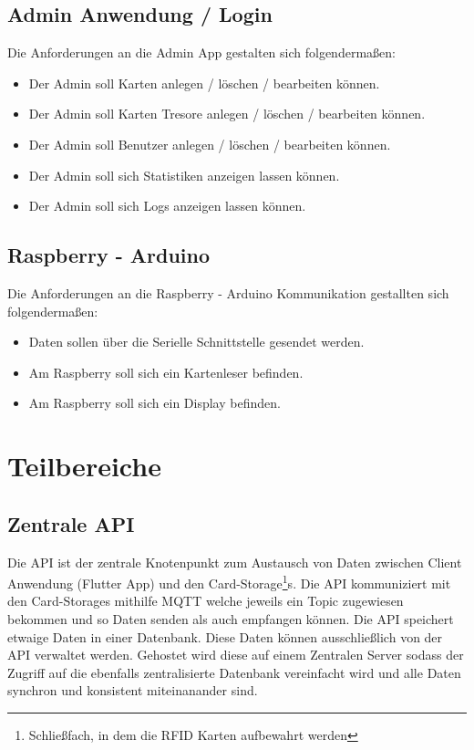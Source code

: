 \documentclass[a4paper]{article}
\begin{document}
\subsection{Admin Anwendung / Login}
Die Anforderungen an die Admin App gestalten sich folgendermaßen:
\begin{itemize}
  \item Der Admin soll Karten anlegen / löschen / bearbeiten können.
  \item Der Admin soll Karten Tresore anlegen / löschen / bearbeiten können.
  \item Der Admin soll Benutzer anlegen / löschen / bearbeiten können.
  \item Der Admin soll sich Statistiken anzeigen lassen können.
  \item Der Admin soll sich Logs anzeigen lassen können.
\end{itemize}


\subsection{Raspberry - Arduino} \label{raspi-arduino-comm}
Die Anforderungen an die Raspberry -  Arduino Kommunikation gestallten sich folgendermaßen:
\begin{itemize}
  \item Daten sollen über die Serielle Schnittstelle gesendet werden.
  \item Am Raspberry soll sich ein Kartenleser befinden.
  \item Am Raspberry soll sich ein Display befinden.
  
\end{itemize}

\newpage
\section{Teilbereiche}
\subsection{Zentrale API} \label{sec-central-api}
Die API ist der zentrale Knotenpunkt zum Austausch von Daten zwischen Client Anwendung (Flutter App) und den Card-Storage\footnote{Schließfach, in dem die RFID Karten aufbewahrt werden}s. Die API kommuniziert mit den Card-Storages mithilfe MQTT welche jeweils ein Topic zugewiesen bekommen und so Daten senden als auch empfangen können. Die API speichert etwaige Daten in einer Datenbank. Diese Daten können ausschließlich von der API verwaltet werden. Gehostet wird diese auf einem Zentralen Server sodass der Zugriff auf die ebenfalls zentralisierte Datenbank vereinfacht wird und alle Daten synchron und konsistent miteinanander sind.
\end{document}
